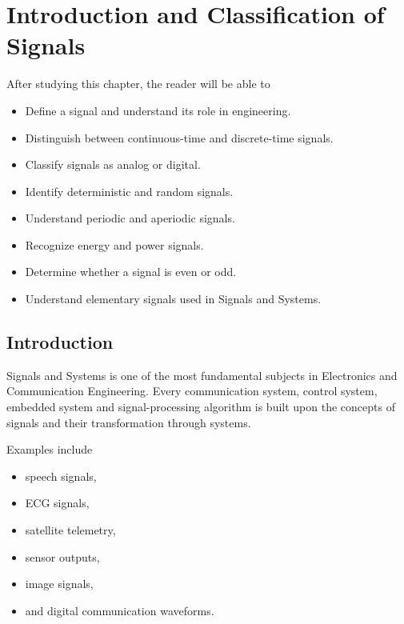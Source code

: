 
\chapter{Introduction and Classification of Signals}

\begin{tcolorbox}[colback=blue!5!white,colframe=blue!70!black,title=Learning Objectives]

After studying this chapter, the reader will be able to

\begin{itemize}
\item Define a signal and understand its role in engineering.
\item Distinguish between continuous-time and discrete-time signals.
\item Classify signals as analog or digital.
\item Identify deterministic and random signals.
\item Understand periodic and aperiodic signals.
\item Recognize energy and power signals.
\item Determine whether a signal is even or odd.
\item Understand elementary signals used in Signals and Systems.
\end{itemize}

\end{tcolorbox}


\section{Introduction}

Signals and Systems is one of the most fundamental subjects in Electronics and
Communication Engineering. Every communication system, control system, embedded
system and signal-processing algorithm is built upon the concepts of signals and
their transformation through systems.

Examples include

\begin{itemize}
\item speech signals,
\item ECG signals,
\item satellite telemetry,
\item sensor outputs,
\item image signals,
\item and digital communication waveforms.
\end{itemize}

